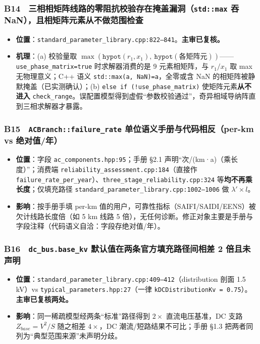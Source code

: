 \documentclass[11pt,a4paper,fontset=fandol]{ctexart}
\newcommand{\file}[1]{\texttt{#1}}
\begin{document}
\subsubsection*{B14　三相相矩阵线路的零阻抗校验存在掩盖漏洞（\texttt{std::max} 吞 NaN），且相矩阵元素从不做范围检查}
\begin{itemize}
  \item \textbf{位置}：\file{standard\_parameter\_library.cpp:822--841}。\textbf{主审已复核。}
  \item \textbf{机理}：(a) 校验量取 $\max(\texttt{hypot}(r_1,x_1),\ \texttt{hypot}(\text{各矩阵元}))$——\texttt{use\_phase\_matrix=true} 时求解器消费的是 9 元素相矩阵，与 $r_1/x_1$ 取 max 无物理意义；C++ 语义 \texttt{std::max(a, NaN)=a}，全零或含 NaN 的相矩阵被静默掩盖（已实测确认）；(b) \texttt{else if (!use\_phase\_matrix)} 使矩阵元素\textbf{从不进入} \texttt{check\_range}。误配置模型得到虚假``参数校验通过''，奇异相域导纳阵直到三相求解器才暴露。
\end{itemize}

\subsubsection*{B15　\texttt{ACBranch::failure\_rate} 单位语义手册与代码相反（per-km vs 绝对值/年）}
\begin{itemize}
  \item \textbf{位置}：字段 \file{ac\_components.hpp:95}；手册 \S 2.1 声明``次/(km·a)（乘长度）''；消费端 \file{reliability\_assessment.cpp:184}（直接作 \texttt{failure\_rate\_per\_year}）、\file{three\_stage\_reliability.cpp:324} 等\textbf{均不再乘长度}；仅填充路径 \file{standard\_parameter\_library.cpp:1002--1006} 做 $\lambda'\times l$。
  \item \textbf{影响}：按手册手填 per-km 值的用户，可靠性指标（SAIFI/SAIDI/EENS）被欠计线路长度倍（如 5 km 线路 5 倍），无任何诊断。修正对象主要是手册与字段注释（代码语义自洽：字段存绝对值/年）。
\end{itemize}

\subsubsection*{B16　\texttt{dc\_bus.base\_kv} 默认值在两条官方填充路径间相差 2 倍且未声明}
\begin{itemize}
  \item \textbf{位置}：\file{standard\_parameter\_library.cpp:409--412}（distribution 剖面 1.5 kV）vs \file{typical\_parameters.hpp:27}（一律 \texttt{kDCDistributionKv = 0.75}）。\textbf{主审已复核两处。}
  \item \textbf{影响}：同一稀疏模型经两条``标准''路径得到 $2\times$ 直流电压基准，DC 支路 $Z_{base}=V^2/S$ 随之相差 $4\times$，DC 潮流/短路结果不可比；手册 \S 1.3 把两者同列为``典型范围来源''未声明分歧。
\end{itemize}
\end{document}
